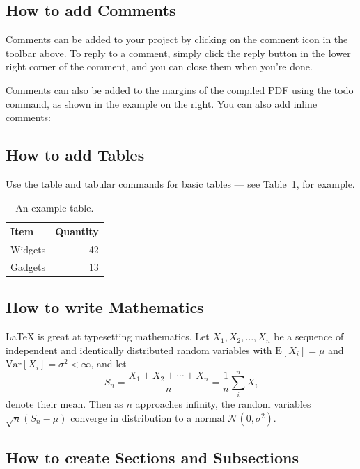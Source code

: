 \documentclass[a4paper]{article}
\begin{document}
\subsection{How to add Comments}

Comments can be added to your project by clicking on the comment icon in the toolbar above. %
%
%
To reply to a comment, simply click the reply button in the lower right corner of the comment, and you can close them when you're done.

Comments can also be added to the margins of the compiled PDF using the todo command, as shown in the example on the right. You can also add inline comments:


\subsection{How to add Tables}

Use the table and tabular commands for basic tables --- see Table~\ref{tab:widgets}, for example. 

\begin{table}
\centering
\begin{tabular}{l|r}
Item & Quantity \\\hline
Widgets & 42 \\
Gadgets & 13
\end{tabular}
\caption{\label{tab:widgets}An example table.}
\end{table}

\subsection{How to write Mathematics}

\LaTeX{} is great at typesetting mathematics. Let $X_1, X_2, \ldots, X_n$ be a sequence of independent and identically distributed random variables with $\text{E}[X_i] = \mu$ and $\text{Var}[X_i] = \sigma^2 < \infty$, and let
\[S_n = \frac{X_1 + X_2 + \cdots + X_n}{n}
      = \frac{1}{n}\sum_{i}^{n} X_i\]
denote their mean. Then as $n$ approaches infinity, the random variables $\sqrt{n}(S_n - \mu)$ converge in distribution to a normal $\mathcal{N}(0, \sigma^2)$.


\subsection{How to create Sections and Subsections}
\end{document}

